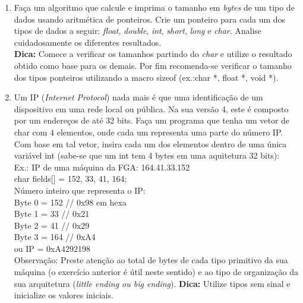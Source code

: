 \documentclass[a4paper,10pt]{article}
\begin{document}
\begin{enumerate}
 \item Faça um algoritmo que calcule e imprima o tamanho em \emph{bytes} de um 
  tipo de dados usando aritmética de ponteiros. Crie um ponteiro para cada um 
  dos tipos de dados a seguir: \emph{float}, \emph{double}, \emph{int}, 
  \emph{short}, \emph{long} e \emph{char}. Analise cuidadosamente os diferentes 
  resultados.\\
  \textbf{Dica:} Comece a verificar os tamanhos partindo do \emph{char} 
  e utilize o resultado obtido como base para os demais. Por fim recomenda-se 
  verificar o tamanho dos tipos ponteiros utilizando a macro sizeof (ex.:char 
  *,   float *, void *).

 \item Um IP (\emph{Internet Protocol}) nada mais é que uma identificação de um 
  dispositivo em uma rede local ou pública. Na sua versão 4, este é composto por 
  um endereços de até 32 bits. Faça um programa que tenha um vetor de char com 
  4 elementos, onde cada um representa uma parte do número IP. Com base em tal 
  vetor, insira cada um dos elementos dentro de uma única variável int (sabe-se 
  que um int tem 4 bytes em uma aquitetura 32 bits):\\
      Ex.: IP de uma máquina da FGA: 164.41.33.152\\
	  char fields[] = {152, 33, 41, 164};\\
	  Número inteiro que representa o IP:\\
	  Byte 0 = 152	// 0x98 em hexa\\
	  Byte 1 = 33	// 0x21\\
	  Byte 2 = 41 	// 0x29\\
	  Byte 3 = 164	// 0xA4\\
	  ou IP = 0xA4292198\\
      Observação: Preste atenção ao total de bytes de cada tipo primitivo da 
      sua máquina (o exercício anterior é útil neste sentido) e ao tipo de 
      organização da sua arquitetura (\emph{little ending ou big ending}).
      \textbf{Dica:} Utilize tipos sem sinal e inicialize os valores iniciais.


\end{enumerate}
\end{document}
